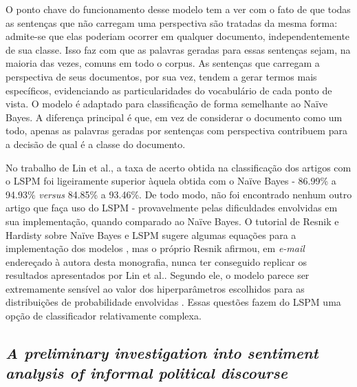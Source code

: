 O ponto chave do funcionamento desse modelo tem a ver com o fato de que todas as sentenças que não carregam uma perspectiva são tratadas da mesma forma: admite-se que elas poderiam ocorrer em qualquer documento, independentemente de sua classe. Isso faz com que as palavras geradas para essas sentenças sejam, na maioria das vezes, comuns em todo o corpus. As sentenças que carregam a perspectiva de seus documentos, por sua vez, tendem a gerar termos mais específicos, evidenciando as particularidades do vocabulário de cada ponto de vista. O modelo é adaptado para classificação de forma semelhante ao Naïve Bayes. A diferença principal é que, em vez de considerar o documento como um todo, apenas as palavras geradas por sentenças com perspectiva contribuem para a decisão de qual é a classe do documento. %


No trabalho de Lin et al., a taxa de acerto obtida na classificação dos artigos com o LSPM foi ligeiramente superior àquela obtida com o Naïve Bayes -  86.99\% a 94.93\% \emph{versus} 84.85\% a 93.46\%. De todo modo, não foi encontrado nenhum outro artigo que faça uso do LSPM - provavelmente pelas dificuldades envolvidas em sua implementação, quando comparado ao Naïve Bayes. O tutorial de Resnik e Hardisty sobre Naïve Bayes e LSPM sugere algumas equações para a implementação dos modelos \cite{resnik}, mas o próprio Resnik afirmou, em \emph{e-mail} endereçado à autora desta monografia, nunca ter conseguido replicar os resultados apresentados por Lin et al.. Segundo ele, o modelo parece ser extremamente sensível ao valor dos hiperparâmetros escolhidos para as distribuições de probabilidade envolvidas \cite{mail-resnik}. Essas questões fazem do LSPM uma opção de classificador relativamente complexa. %

\subsection{\emph{A preliminary investigation into sentiment analysis of informal political discourse}}
\label{sec:aaai}

